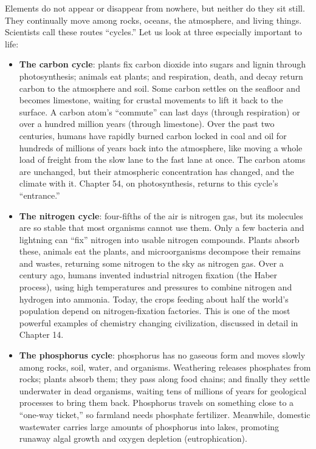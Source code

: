 Elements do not appear or disappear from nowhere, but neither do they sit still. They continually move among rocks, oceans, the atmosphere, and living things. Scientists call these routes ``cycles.'' Let us look at three especially important to life:

\begin{itemize}[itemsep=2pt]
\item \textbf{The carbon cycle}: plants fix carbon dioxide into sugars and lignin through photosynthesis; animals eat plants; and respiration, death, and decay return carbon to the atmosphere and soil. Some carbon settles on the seafloor and becomes limestone, waiting for crustal movements to lift it back to the surface. A carbon atom's ``commute'' can last days (through respiration) or over a hundred million years (through limestone). Over the past two centuries, humans have rapidly burned carbon locked in coal and oil for hundreds of millions of years back into the atmosphere, like moving a whole load of freight from the slow lane to the fast lane at once. The carbon atoms are unchanged, but their atmospheric concentration has changed, and the climate with it. Chapter 54, on photosynthesis, returns to this cycle's ``entrance.''
\item \textbf{The nitrogen cycle}: four-fifths of the air is nitrogen gas, but its molecules are so stable that most organisms cannot use them. Only a few bacteria and lightning can ``fix'' nitrogen into usable nitrogen compounds. Plants absorb these, animals eat the plants, and microorganisms decompose their remains and wastes, returning some nitrogen to the sky as nitrogen gas. Over a century ago, humans invented industrial nitrogen fixation (the Haber process), using high temperatures and pressures to combine nitrogen and hydrogen into ammonia. Today, the crops feeding about half the world's population depend on nitrogen-fixation factories. This is one of the most powerful examples of chemistry changing civilization, discussed in detail in Chapter 14.
\item \textbf{The phosphorus cycle}: phosphorus has no gaseous form and moves slowly among rocks, soil, water, and organisms. Weathering releases phosphates from rocks; plants absorb them; they pass along food chains; and finally they settle underwater in dead organisms, waiting tens of millions of years for geological processes to bring them back. Phosphorus travels on something close to a ``one-way ticket,'' so farmland needs phosphate fertilizer. Meanwhile, domestic wastewater carries large amounts of phosphorus into lakes, promoting runaway algal growth and oxygen depletion (eutrophication).
\end{itemize}

